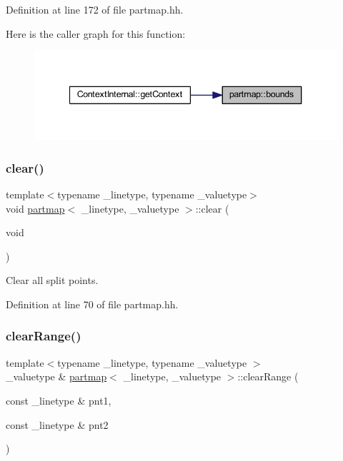 Definition at line 172 of file partmap.\+hh.

Here is the caller graph for this function\+:
\nopagebreak
\begin{figure}[H]
\begin{center}
\leavevmode
\includegraphics[width=340pt]{classpartmap_ac0e5535fb352dd1bd1d85971cdac1d9f_icgraph}
\end{center}
\end{figure}
\mbox{\label{classpartmap_a4409658f41f6281f938cb649a1c74c8f}} 
\subsubsection{\texorpdfstring{clear()}{clear()}}
{\footnotesize\ttfamily template$<$typename \+\_\+linetype, typename \+\_\+valuetype$>$ \\
void \mbox{\hyperlink{classpartmap}{partmap}}$<$ \+\_\+linetype, \+\_\+valuetype $>$\+::clear (\begin{DoxyParamCaption}\item[{void}]{ }\end{DoxyParamCaption})\hspace{0.3cm}{\ttfamily [inline]}}



Clear all split points. 



Definition at line 70 of file partmap.\+hh.

\mbox{\label{classpartmap_a3b1d7eb7e874b0f11ea3a578de6d0263}} 
\subsubsection{\texorpdfstring{clearRange()}{clearRange()}}
{\footnotesize\ttfamily template$<$typename \+\_\+linetype, typename \+\_\+valuetype $>$ \\
\+\_\+valuetype \& \mbox{\hyperlink{classpartmap}{partmap}}$<$ \+\_\+linetype, \+\_\+valuetype $>$\+::clear\+Range (\begin{DoxyParamCaption}\item[{const \+\_\+linetype \&}]{pnt1,  }\item[{const \+\_\+linetype \&}]{pnt2 }\end{DoxyParamCaption})}



